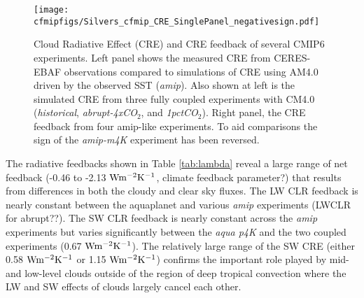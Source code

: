 \documentclass[draft]{agujournal2019}
\begin{document}
\begin{figure}
  \centering
  \texttt{[image: cfmipfigs/Silvers\_cfmip\_CRE\_SinglePanel\_negativesign.pdf]}
  \caption{Cloud Radiative Effect (CRE) and CRE feedback of several CMIP6 experiments.  Left panel 
  shows the measured CRE from CERES-EBAF 
  observations compared to simulations of CRE using AM4.0 driven by the observed SST (\textit{amip}).  Also 
  shown at left is the simulated CRE from three fully coupled experiments with CM4.0 (\textit{historical},
  \textit{abrupt-4xCO$_2$}, and \textit{1pctCO$_2$}).  Right panel, the CRE feedback from four 
  amip-like experiments.  To aid comparisons the sign of the \textit{amip-m4K} experiment has 
  been reversed.}
  \label{fig:CRE_feedback}
\end{figure}    


%
%

The radiative feedbacks shown in Table \ref{tab:lambda} reveal a large range of net feedback 
(-0.46 to -2.13 $\rm{W m^{-2}K^{-1}}$, climate feedback parameter?) that results from differences in 
both the cloudy and clear sky fluxes.   The LW CLR feedback is nearly constant between the 
aquaplanet and various \textit{amip} experiments (LWCLR for abrupt??).   The SW CLR 
feedback is nearly constant across the \textit{amip} experiments but varies significantly
between the \textit{aqua p4K} and the two coupled experiments (0.67 $\rm{W m^{-2}K^{-1}}$).
The relatively large range of the SW CRE (either 0.58 $\rm{W m^{-2}K^{-1}}$ or 1.15 $\rm{W m^{-2}K^{-1}}$)
confirms the important role played by mid- and low-level clouds outside of the region of 
deep tropical convection where the LW and SW effects of clouds largely cancel each other.  
\end{document}
